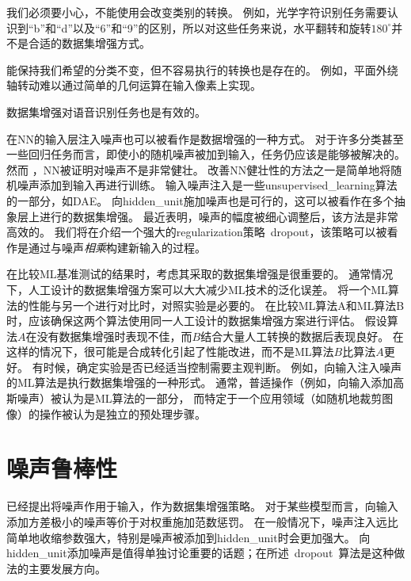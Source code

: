 我们必须要小心，不能使用会改变类别的转换。
例如，光学字符识别任务需要认识到``b''和``d''以及``6''和``9''的区别，所以对这些任务来说，水平翻转和旋转$180^{\circ}$并不是合适的数据集增强方式。


能保持我们希望的分类不变，但不容易执行的转换也是存在的。
例如，平面外绕轴转动难以通过简单的几何运算在输入像素上实现。

数据集增强对语音识别任务也是有效的\citep{Jaitly-Hinton-2013}。

在\gls{NN}的输入层注入噪声\citep{Sietsma-Dow-1991}也可以被看作是数据增强的一种方式。
对于许多分类甚至一些回归任务而言，即使小的随机噪声被加到输入，任务仍应该是能够被解决的。
然而 ，\gls{NN}被证明对噪声不是非常健壮\citep{Tang-Eliasmith-2010}。
改善\gls{NN}健壮性的方法之一是简单地将随机噪声添加到输入再进行训练。
输入噪声注入是一些\gls{unsupervised_learning}算法的一部分，如\gls{DAE}\citep{Vincent-et-al-2008}。
向\gls{hidden_unit}施加噪声也是可行的，这可以被看作在多个抽象层上进行的数据集增强。
\cite{Poole-et-al-2014}最近表明，噪声的幅度被细心调整后，该方法是非常高效的。
我们将在介绍一个强大的\gls{regularization}策略~\gls{dropout}，该策略可以被看作是通过与噪声\emph{相乘}构建新输入的过程。

在比较\gls{ML}基准测试的结果时，考虑其采取的数据集增强是很重要的。
通常情况下，人工设计的数据集增强方案可以大大减少\gls{ML}技术的泛化误差。
将一个\gls{ML}算法的性能与另一个进行对比时，对照实验是必要的。
在比较\gls{ML}算法A和\gls{ML}算法B时，应该确保这两个算法使用同一人工设计的数据集增强方案进行评估。
假设算法$A$在没有数据集增强时表现不佳，而$B$结合大量人工转换的数据后表现良好。
在这样的情况下，很可能是合成转化引起了性能改进，而不是\gls{ML}算法$B$比算法$A$更好。 
有时候，确定实验是否已经适当控制需要主观判断。
例如，向输入注入噪声的\gls{ML}算法是执行数据集增强的一种形式。
通常，普适操作（例如，向输入添加高斯噪声）被认为是\gls{ML}算法的一部分，
而特定于一个应用领域（如随机地裁剪图像）的操作被认为是独立的预处理步骤。


\section{噪声鲁棒性}
\label{sec:noise_robustness}

已经提出将噪声作用于输入，作为数据集增强策略。
对于某些模型而言，向输入添加方差极小的噪声等价于对权重施加范数惩罚\citep{Bishop-1995a,Bishop-1995b}。
在一般情况下，噪声注入远比简单地收缩参数强大，特别是噪声被添加到\gls{hidden_unit}时会更加强大。
向\gls{hidden_unit}添加噪声是值得单独讨论重要的话题；在所述~\gls{dropout}~算法是这种做法的主要发展方向。

